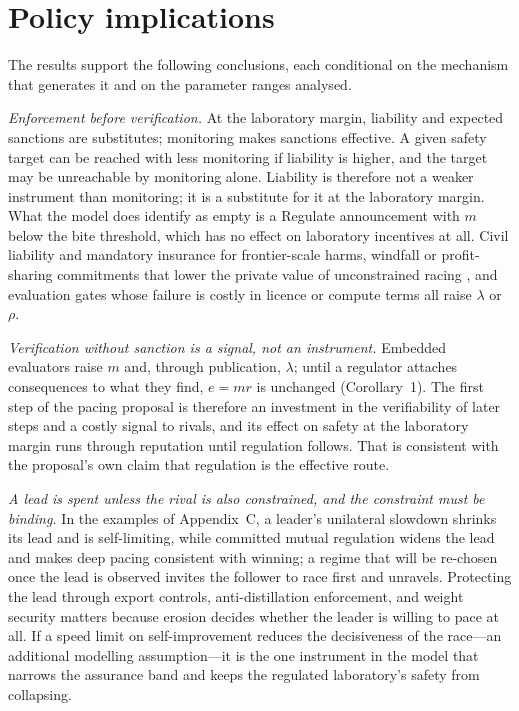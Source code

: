 \documentclass[11pt]{article}
\theoremstyle{plain}
\theoremstyle{definition}
\theoremstyle{remark}
\begin{document}
\section{Policy implications}

The results support the following conclusions, each conditional on the mechanism that generates it and on the parameter ranges analysed.

\emph{Enforcement before verification.} At the laboratory margin, liability and expected sanctions are substitutes; monitoring makes sanctions effective. A given safety target can be reached with less monitoring if liability is higher, and the target may be unreachable by monitoring alone. Liability is therefore not a weaker instrument than monitoring; it is a substitute for it at the laboratory margin. What the model does identify as empty is a Regulate announcement with $m$ below the bite threshold, which has no effect on laboratory incentives at all. Civil liability and mandatory insurance for frontier-scale harms, windfall or profit-sharing commitments that lower the private value of unconstrained racing \citep{okeefe2020,askell2019}, and evaluation gates whose failure is costly in licence or compute terms all raise $\lambda$ or $\rho$.

\emph{Verification without sanction is a signal, not an instrument.} Embedded evaluators raise $m$ and, through publication, $\lambda$; until a regulator attaches consequences to what they find, $e=mr$ is unchanged (Corollary~1). The first step of the pacing proposal \citep{amodei2026} is therefore an investment in the verifiability of later steps and a costly signal to rivals, and its effect on safety at the laboratory margin runs through reputation until regulation follows. That is consistent with the proposal's own claim that regulation is the effective route.

\emph{A lead is spent unless the rival is also constrained, and the constraint must be binding.} In the examples of Appendix~C, a leader's unilateral slowdown shrinks its lead and is self-limiting, while committed mutual regulation widens the lead and makes deep pacing consistent with winning; a regime that will be re-chosen once the lead is observed invites the follower to race first and unravels. Protecting the lead through export controls, anti-distillation enforcement, and weight security matters because erosion decides whether the leader is willing to pace at all. If a speed limit on self-improvement reduces the decisiveness of the race---an additional modelling assumption---it is the one instrument in the model that narrows the assurance band and keeps the regulated laboratory's safety from collapsing.
\end{document}
